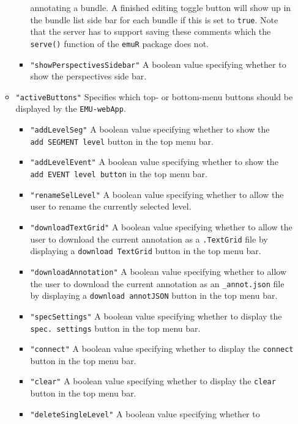\documentclass[]{book}
\theoremstyle{definition}
\theoremstyle{definition}
\theoremstyle{definition}
\theoremstyle{remark}
\begin{document}
\begin{itemize}
\begin{itemize}
\begin{itemize}
      annotating a bundle. A finished editing toggle button will show up
      in the bundle list side bar for each bundle if this is set to
      \texttt{true}. Note that the server has to support saving these
      comments which the \texttt{serve()} function of the \texttt{emuR}
      package does not.
    \item
      \texttt{"showPerspectivesSidebar"} A boolean value specifying
      whether to show the perspectives side bar.
    \end{itemize}
  \item
    \texttt{"activeButtons"} Specifies which top- or bottom-menu buttons
    should be displayed by the \texttt{EMU-webApp}.

    \begin{itemize}
    \item
      \texttt{"addLevelSeg"} A boolean value specifying whether to show
      the \texttt{add\ SEGMENT\ level} button in the top menu bar.
    \item
      \texttt{"addLevelEvent"} A boolean value specifying whether to
      show the \texttt{add\ EVENT\ level\ button} in the top menu bar.
    \item
      \texttt{"renameSelLevel"} A boolean value specifying whether to
      allow the user to rename the currently selected level.
    \item
      \texttt{"downloadTextGrid"} A boolean value specifying whether to
      allow the user to download the current annotation as a
      \texttt{.TextGrid} file by displaying a
      \texttt{download\ TextGrid} button in the top menu bar.
    \item
      \texttt{"downloadAnnotation"} A boolean value specifying whether
      to allow the user to download the current annotation as an
      \texttt{\_annot.json} file by displaying a
      \texttt{download\ annotJSON} button in the top menu bar.
    \item
      \texttt{"specSettings"} A boolean value specifying whether to
      display the \texttt{spec.\ settings} button in the top menu bar.
    \item
      \texttt{"connect"} A boolean value specifying whether to display
      the \texttt{connect} button in the top menu bar.
    \item
      \texttt{"clear"} A boolean value specifying whether to display the
      \texttt{clear} button in the top menu bar.
    \item
      \texttt{"deleteSingleLevel"} A boolean value specifying whether to

\end{itemize}
\end{itemize}
\end{itemize}
\end{document}
